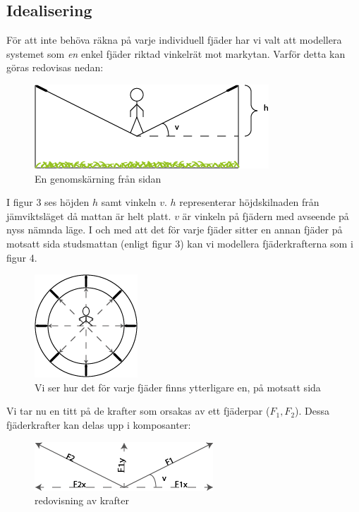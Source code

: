 \documentclass[10pt,a4paper]{article}
\begin{document}
\subsection{Idealisering}
För att inte behöva räkna på varje individuell fjäder har vi valt att modellera systemet som \textit{en} enkel fjäder riktad vinkelrät mot markytan. Varför detta kan göras redovisas nedan:

\begin{figure}[ht]
\begin{center}
\includegraphics[scale=0.8]{fransidan}
\caption{En genomskärning från sidan}
\end{center}
\end{figure}
I figur 3 ses höjden $h$ samt vinkeln $v$. $h$ representerar höjdskilnaden från jämviktsläget då mattan är helt platt. $v$ är vinkeln på fjädern med avseende på nyss nämnda läge.
I och med att det för varje fjäder sitter en annan fjäder på motsatt sida studsmattan (enligt figur 3) kan vi modellera fjäderkrafterna som i figur 4.
\begin{figure}[ht]
\begin{center}
\includegraphics[scale=1]{ovanifran}
\caption{Vi ser hur det för varje fjäder finns ytterligare en, på motsatt sida}
\end{center}
\end{figure}

Vi tar nu en titt på de krafter som orsakas av ett fjäderpar ($F_1,F_2$). Dessa fjäderkrafter kan delas upp i komposanter:
\begin{figure}[ht]
\begin{center}
\includegraphics[scale=1]{krafter}
\caption{redovisning av krafter}
\end{center}
\end{figure}
\end{document}
